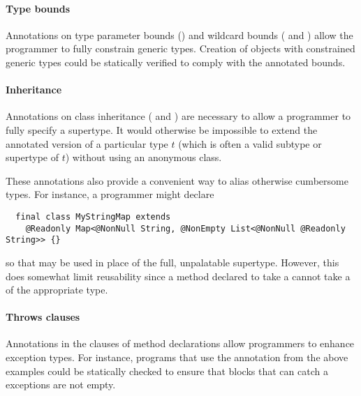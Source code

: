 \documentclass[10pt]{article}
\newcommand{\preverbnegspace}{\vspace{-5pt}}
\begin{document}

\paragraph{Type bounds}
Annotations on type parameter bounds ()
and wildcard bounds ( and )
allow the programmer to fully constrain generic types.  Creation of
objects with constrained generic types could be statically verified to
comply with the annotated bounds.

\paragraph{Inheritance}
Annotations on class inheritance ( and
) are necessary to allow a programmer to fully
specify a supertype. It would otherwise be impossible to extend the
annotated version of a particular type $t$ (which is often a valid
subtype or supertype of $t$) without using an anonymous class.

\noindent
\label{class-inheritance-annotations}
These annotations also provide a convenient way to alias otherwise
cumbersome types. For instance, a programmer might declare

\preverbnegspace
\begin{Verbatim}
  final class MyStringMap extends
    @Readonly Map<@NonNull String, @NonEmpty List<@NonNull @Readonly String>> {}
\end{Verbatim}

\noindent
so that  may be used in place of the full,
unpalatable supertype.  However, this does somewhat limit reusability
since a method declared to take a  cannot take a
 of the appropriate type.

\paragraph{Throws clauses}
Annotations in the  clauses of method declarations allow
programmers to enhance exception types. For instance, programs that
use the  annotation from the above examples could be
statically checked to ensure that  blocks that can catch a
 exceptions are not empty.
\end{document}
